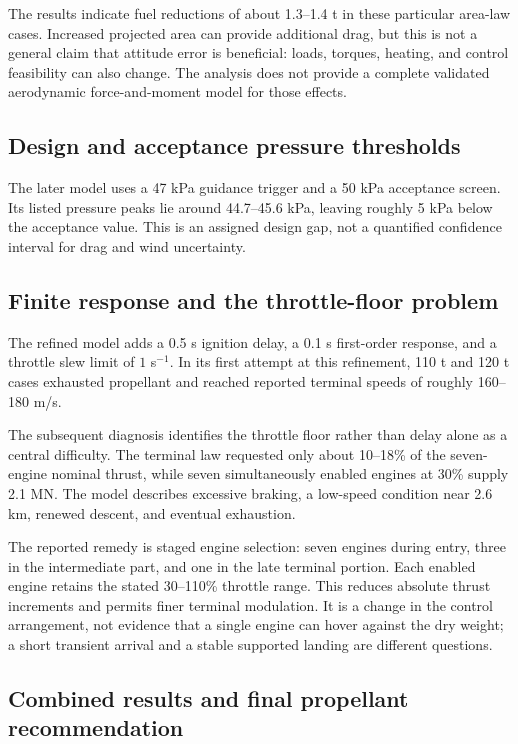 \documentclass[11pt,a4paper]{article}
\begin{document}


The results indicate fuel reductions of about 1.3--1.4 t in these particular area-law cases. Increased projected area can provide additional drag, but this is not a general claim that attitude error is beneficial: loads, torques, heating, and control feasibility can also change. The analysis does not provide a complete validated aerodynamic force-and-moment model for those effects.

\subsection{Design and acceptance pressure thresholds}
The later model uses a 47 kPa guidance trigger and a 50 kPa acceptance screen. Its listed pressure peaks lie around 44.7--45.6 kPa, leaving roughly 5 kPa below the acceptance value. This is an assigned design gap, not a quantified confidence interval for drag and wind uncertainty.

\subsection{Finite response and the throttle-floor problem}
The refined model adds a 0.5 s ignition delay, a 0.1 s first-order response, and a throttle slew limit of $1$ s$^{-1}$. In its first attempt at this refinement, 110 t and 120 t cases exhausted propellant and reached reported terminal speeds of roughly 160--180 m/s.

The subsequent diagnosis identifies the throttle floor rather than delay alone as a central difficulty. The terminal law requested only about 10--18\% of the seven-engine nominal thrust, while seven simultaneously enabled engines at 30\% supply 2.1 MN. The model describes excessive braking, a low-speed condition near 2.6 km, renewed descent, and eventual exhaustion.

The reported remedy is staged engine selection: seven engines during entry, three in the intermediate part, and one in the late terminal portion. Each enabled engine retains the stated 30--110\% throttle range. This reduces absolute thrust increments and permits finer terminal modulation. It is a change in the control arrangement, not evidence that a single engine can hover against the dry weight; a short transient arrival and a stable supported landing are different questions.

\subsection{Combined results and final propellant recommendation}

\end{document}

